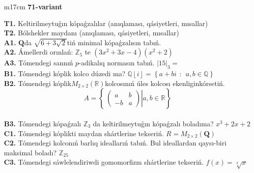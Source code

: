 \documentclass{article}
\begin{document}
\begin{tabular}{m{17cm}}
\textbf{71-variant}
\newline

\textbf{T1.} Keltirilmeytuǵın kópaǵzalılar (anıqlaması, qásiyetleri, mısallar) \\
\textbf{T2.} Bólshekler maydanı (anıqlaması, qásiyetleri, mısallar) \\
\textbf{A1.} \(\mathbf{Q}\)da \(\sqrt{6 + 3\sqrt{2}}\)tiń minimal kópaǵzalısın tabıń. \\
\textbf{A2.} Ámellerdi orınlań: \(\mathbb{Z}_{5}\) te \(\left( 3x^{2} + 3x - 4 \right)\left( x^{2} + 2 \right)\) \\
\textbf{A3.} Tómendegi sannıń \(p\)-adikalıq normasın tabıń. \(|15|_{3} =\) \\
\textbf{B1.} Tómendegi kóplik kolco dúzedi ma? \(\mathbb{Q}\left\lfloor i \right\rfloor = \left\{ a + bi\ \ :\ \ a,b\mathbb{\in Q} \right\}\) \\
\textbf{B2.} Tómendegi kóplik\(M_{2 \times 2}\left( \mathbb{R} \right)\)kolcosınıń úles kolcosı ekenliginkórsetiń.
\[A = \left\{ \left. \ \begin{pmatrix}
a & b \\
 - b & a
\end{pmatrix} \right|a,b\mathbb{\in R} \right\}\] \\
\textbf{B3.} Tómendegi kópaǵzalı \(\mathbb{Z}_{3}\) da keltirilmeytuǵın kópaǵzalı boladıma? \(x^{3} + 2x + 2\) \\
\textbf{C1.} Tómendegi kóplikti maydan shártlerine tekseriń. \(R = M_{2 \times 2}\left( \mathbf{Q} \right)\) \\
\textbf{C2.} Tómendegi kolconıń barlıq ideallarıń tabıń. Bul ideallardan qaysı-biri maksimal boladı? \(\mathbb{Z}_{25}\) \\
\textbf{C3.} Tómendegi sáwlelendiriwdi gomomorfizm shártlerine tekseriń. \(f(x) = \sqrt[3]{x}\) \\

\end{tabular}
\vspace{1cm}
\end{document}
